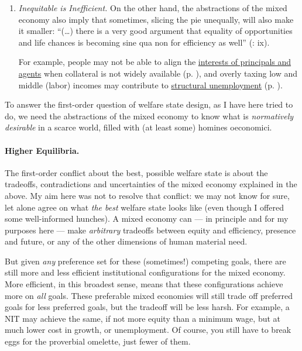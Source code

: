 \begin{enumerate}
\begin{enumerate}
		\item \emph{Inequitable is Inefficient.} On the other hand, the abstractions of the mixed economy also imply that sometimes, slicing the pie unequally, will also make it smaller: ``(\ldots) there is a very good argument that equality of opportunities and life chances is becoming sine qua non for efficiency as well'' (\citealt{Esping-Andersen2002}: ix).
		
		For example, people may not be able to align the \hyperref[sec:principal-agentproblem]{interests of principals and agents} when collateral is not widely available (p. \pageref{sec:principal-agentproblem}), and overly taxing low and middle (labor) incomes may contribute to \hyperref[sec:minimalDWL]{structural unemployment} (p. \pageref{sec:minimalDWL}).
	\end{enumerate}
	
	To answer the first-order question of welfare state design, as I have here tried to do, we need the abstractions of the mixed economy to know what is \emph{normatively desirable} in a scarce world, filled with (at least some) homines oeconomici.	
\end{enumerate}

\paragraph[Higher Equilibria]{Higher Equilibria.} The first-order conflict about the best, possible welfare state is about the tradeoffs, contradictions and uncertainties of the mixed economy explained in the above. My aim here was not to resolve that conflict: we may not know for sure, let alone agree on what \emph{the best} welfare state looks like (even though I offered some well-informed hunches). A mixed economy can --- in principle and for my purposes here --- make \emph{arbitrary} tradeoffs between equity and efficiency, presence and future, or any of the other dimensions of human material need. 

But given \emph{any} preference set for these (sometimes!) competing goals, there are still more and less efficient institutional configurations for the mixed economy. More efficient, in this broadest sense, means that these configurations achieve more on \emph{all} goals. These preferable mixed economies will still trade off preferred goals for less preferred goals, but the tradeoff will be less harsh. For example, a \gls{NIT} may achieve the same, if not more equity than a minimum wage, but at much lower cost in growth, or unemployment. Of course, you still have to break eggs for the proverbial omelette, just fewer of them.

